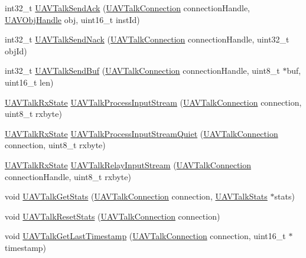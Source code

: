 \begin{DoxyCompactItemize}
\item 
int32\-\_\-t \hyperlink{group___u_a_v_talk_gab995cc19b4024b1a6303c963e139f522}{\-U\-A\-V\-Talk\-Send\-Ack} (\hyperlink{group___u_a_v_talk_gaeff1721eaebd4ab306057b4017f23f36}{\-U\-A\-V\-Talk\-Connection} connection\-Handle, \hyperlink{targets_2_u_a_v_objects_2inc_2uavobjectmanager_8h_a279053e22be53ce9f895043aaeb91e3b}{\-U\-A\-V\-Obj\-Handle} obj, uint16\-\_\-t inst\-Id)
\item 
int32\-\_\-t \hyperlink{group___u_a_v_talk_ga2ef859d444a819ed3e3bb4ea36761c69}{\-U\-A\-V\-Talk\-Send\-Nack} (\hyperlink{group___u_a_v_talk_gaeff1721eaebd4ab306057b4017f23f36}{\-U\-A\-V\-Talk\-Connection} connection\-Handle, uint32\-\_\-t obj\-Id)
\item 
int32\-\_\-t \hyperlink{group___u_a_v_talk_ga75dcc116d1af9cb73a58c233a2d95bed}{\-U\-A\-V\-Talk\-Send\-Buf} (\hyperlink{group___u_a_v_talk_gaeff1721eaebd4ab306057b4017f23f36}{\-U\-A\-V\-Talk\-Connection} connection\-Handle, uint8\-\_\-t $\ast$buf, uint16\-\_\-t len)
\item 
\hyperlink{group___u_a_v_talk_ga8a49dc52ac01b5d0782811f284df691c}{\-U\-A\-V\-Talk\-Rx\-State} \hyperlink{group___u_a_v_talk_ga1a738a506f26790d1b9c9fac5b6e1d92}{\-U\-A\-V\-Talk\-Process\-Input\-Stream} (\hyperlink{group___u_a_v_talk_gaeff1721eaebd4ab306057b4017f23f36}{\-U\-A\-V\-Talk\-Connection} connection, uint8\-\_\-t rxbyte)
\item 
\hyperlink{group___u_a_v_talk_ga8a49dc52ac01b5d0782811f284df691c}{\-U\-A\-V\-Talk\-Rx\-State} \hyperlink{group___u_a_v_talk_ga174ffb688889f75507fc022eaf33d52e}{\-U\-A\-V\-Talk\-Process\-Input\-Stream\-Quiet} (\hyperlink{group___u_a_v_talk_gaeff1721eaebd4ab306057b4017f23f36}{\-U\-A\-V\-Talk\-Connection} connection, uint8\-\_\-t rxbyte)
\item 
\hyperlink{group___u_a_v_talk_ga8a49dc52ac01b5d0782811f284df691c}{\-U\-A\-V\-Talk\-Rx\-State} \hyperlink{group___u_a_v_talk_ga11bfbe431f2e79f43a4321b942dc94c8}{\-U\-A\-V\-Talk\-Relay\-Input\-Stream} (\hyperlink{group___u_a_v_talk_gaeff1721eaebd4ab306057b4017f23f36}{\-U\-A\-V\-Talk\-Connection} connection\-Handle, uint8\-\_\-t rxbyte)
\item 
void \hyperlink{group___u_a_v_talk_gaeccb32b1562a98d5586bb3d4d25715ee}{\-U\-A\-V\-Talk\-Get\-Stats} (\hyperlink{group___u_a_v_talk_gaeff1721eaebd4ab306057b4017f23f36}{\-U\-A\-V\-Talk\-Connection} connection, \hyperlink{struct_u_a_v_talk_stats}{\-U\-A\-V\-Talk\-Stats} $\ast$stats)
\item 
void \hyperlink{group___u_a_v_talk_gafea32b2e3331f9e81f48979b0e6c0a0b}{\-U\-A\-V\-Talk\-Reset\-Stats} (\hyperlink{group___u_a_v_talk_gaeff1721eaebd4ab306057b4017f23f36}{\-U\-A\-V\-Talk\-Connection} connection)
\item 
void \hyperlink{group___u_a_v_talk_ga4134f84aca917fe6e3eca1eaacf0664e}{\-U\-A\-V\-Talk\-Get\-Last\-Timestamp} (\hyperlink{group___u_a_v_talk_gaeff1721eaebd4ab306057b4017f23f36}{\-U\-A\-V\-Talk\-Connection} connection, uint16\-\_\-t $\ast$timestamp)
\end{DoxyCompactItemize}


